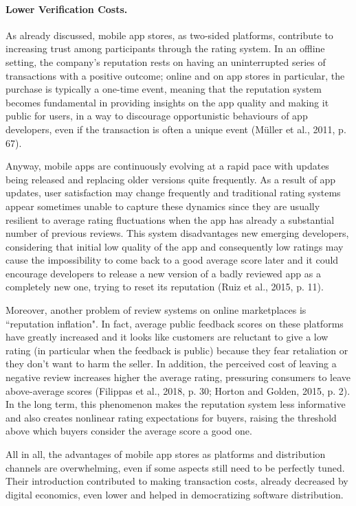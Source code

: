 \paragraph{Lower Verification Costs.}
As already discussed, mobile app stores, as two-sided platforms, contribute to increasing trust among participants through the rating system. In an offline setting, the company's reputation rests on having an uninterrupted series of transactions with a positive outcome; online and on app stores in particular, the purchase is typically a one-time event, meaning that the reputation system becomes fundamental in providing insights on the app quality and making it public for users, in a way to discourage opportunistic behaviours of app developers, even if the transaction is often a unique event (Müller et al., 2011, p. 67). 

Anyway, mobile apps are continuously evolving at a rapid pace with updates being released and replacing older versions quite frequently. As a result of app updates, user satisfaction may change frequently and traditional rating systems appear sometimes unable to capture these dynamics since they are usually resilient to average rating fluctuations when the app has already a substantial number of previous reviews. This system disadvantages new emerging developers, considering that initial low quality of the app and consequently low ratings may cause the impossibility to come back to a good average score later and it could encourage developers to release a new version of a badly reviewed app as a completely new one, trying to reset its reputation (Ruiz et al., 2015, p. 11).

Moreover, another problem of review systems on online marketplaces is ``reputation inflation". In fact, average public feedback scores on these platforms have greatly increased and it looks like customers are reluctant to give a low rating (in particular when the feedback is public) because they fear retaliation or they don't want to harm the seller. In addition, the perceived cost of leaving a negative review increases higher the average rating, pressuring consumers to leave above-average scores (Filippas et al., 2018, p. 30; Horton and Golden, 2015, p. 2). In the long term, this phenomenon makes the reputation system less informative and also creates nonlinear rating expectations for buyers, raising the threshold above which buyers consider the average score a good one.

All in all, the advantages of mobile app stores as platforms and distribution channels are overwhelming, even if some aspects still need to be perfectly tuned. Their introduction contributed to making transaction costs, already decreased by digital economics, even lower and helped in democratizing software distribution.

